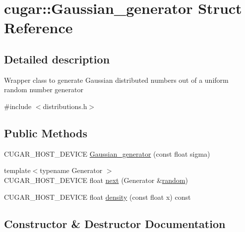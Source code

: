 \hypertarget{structcugar_1_1_gaussian__generator}{}\section{cugar\+:\+:Gaussian\+\_\+generator Struct Reference}
\label{structcugar_1_1_gaussian__generator}


\subsection{Detailed description}
Wrapper class to generate Gaussian distributed numbers out of a uniform random number generator 

{\ttfamily \#include $<$distributions.\+h$>$}

\subsection*{Public Methods}
\begin{DoxyCompactItemize}
\item 
C\+U\+G\+A\+R\+\_\+\+H\+O\+S\+T\+\_\+\+D\+E\+V\+I\+CE \hyperlink{structcugar_1_1_gaussian__generator_a9e2fcb53df5aa466152cc4cdddc7d798}{Gaussian\+\_\+generator} (const float sigma)
\item 
{\footnotesize template$<$typename Generator $>$ }\\C\+U\+G\+A\+R\+\_\+\+H\+O\+S\+T\+\_\+\+D\+E\+V\+I\+CE float \hyperlink{structcugar_1_1_gaussian__generator_a05e4e7489ee54bbcc2bbd80446f6e088}{next} (Generator \&\hyperlink{group___sampling_module_gaec17bbbfd36295353081b7b4480d933d}{random})
\item 
C\+U\+G\+A\+R\+\_\+\+H\+O\+S\+T\+\_\+\+D\+E\+V\+I\+CE float \hyperlink{structcugar_1_1_gaussian__generator_ae2234cab60f8a190b135b6e1dc0735fb}{density} (const float x) const
\end{DoxyCompactItemize}


\subsection{Constructor \& Destructor Documentation}
\mbox{\label{structcugar_1_1_gaussian__generator_a9e2fcb53df5aa466152cc4cdddc7d798}} 
